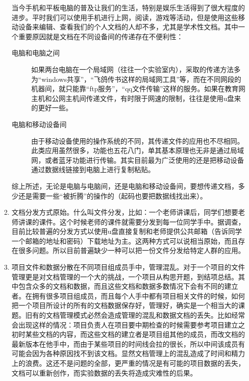\begin{enumerate}
当今手机和平板电脑的普及让我们的生活，特别是娱乐生活得到了很大程度的进步。平时我们可以使用手机进行上网，阅读，游戏等活动，但是使用这些移动设备来编辑、查看我们的个人文档的人却不多，尤其是学术性文档。其中一个重要原因就是文档在不同设备间的传递存在不便利性：
  \begin{description}
  \item[电脑和电脑之间] 如果两台电脑在一个局域网（往往一个实验室内），采取的传递方法多为“windows共享”，“飞鸽传书这样的局域网工具”等，而在不同网段的机器间，就只能靠“ftp服务”，“qq文件传输”这样的服务。如果在教育网主机和公网主机间传递文件，有时限于网速的限制，往往是使用u盘来的更好一些。
  \item[电脑和移动设备间] 由于移动设备使用的操作系统的不同，其传递文件的应用也不尽相同。此类应用虽然很多，功能也五花八门，单其基本原理也无非是通过局域网，或者蓝牙功能进行传输。其实目前最为广泛使用的还是把移动设备通过数据线链接到电脑上进行复制粘贴。
  \end{description}
综上所述，无论是电脑与电脑间，还是电脑和移动设备间，要想传递文档，多少还是需要一些“被折腾”的操作的（起码也要把数据线找出来）。
\item 文档分发方式原始。什么叫文件分发，比如：一个老师讲课后，同学们想要老师讲课的课件。这个时候老师的课件就需要分发到每一位同学手中。据调查，目前比较普遍的分发方式以使用u盘直接复制和老师提供公共邮箱（告诉同学一个邮箱的地址和密码）下载地址为主。这两种方式可以说相当原始，而且存在很多问题。所以目前普遍缺少一种可以把一份文件分发给特定人群的应用。
\item 项目文件和数据分散在不同项目组成员手中，管理混乱。对于一个项目的文件管理更是对文档管理的一个大的挑战，一个项目从构思开题，到结项总结。其中包含众多的文档和数据，而且这些文档和数据多数情况下会有不同的建立者。在拥有很多项目组成员，而且每个人手中都有项目相关文件的时候，如何把一个项目所设计的所有的文档数据保存好，管理好，确实是一个相当大的课题。旧有的文档管理模式必然会造成管理的混乱和数据文档的丢失。比如经常会出现这样的情况：项目负责人在项目要中期检查的时候需要参考项目建立之初时某些文档的内容，而这些文档的建立者是项目组其他的成员，而改文档的最新版本在他手中，而由于某些项目的时间线会拉的很长，所以中间该成员有可能会因为各种原因找不到该文档。显然文档管理上的混乱造成了时间和精力上的浪费。这还不是问题的全部，更严重的情况是有可能的项目数据的丢失，文档可以重新创作，而实验数据的丢失将造成灾难性的后果。


\end{enumerate}
